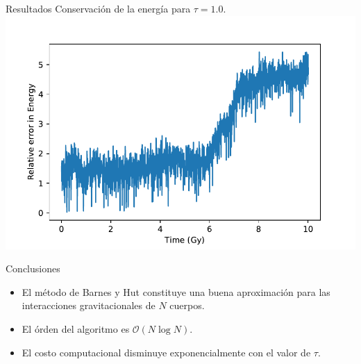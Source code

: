 \documentclass[handout]{beamer}
\begin{document}
\begin{frame}{Resultados}
	Conservaci\'on de la energ\'ia para $\tau = 1.0$.
	\centering
	\includegraphics[width=0.8\linewidth]{sources/images/energy.pdf}
\end{frame}
\begin{frame}{Conclusiones}
	\begin{itemize}
		\item El m\'etodo de Barnes y Hut constituye una buena aproximaci\'on para las interacciones gravitacionales de $N$ cuerpos.
		
		\item El \'orden del algoritmo es $\mathcal{O}(N\log N)$.
		
		\item El costo computacional disminuye exponencialmente con el valor de $\tau$.
	\end{itemize}
\end{frame}
\end{document}
